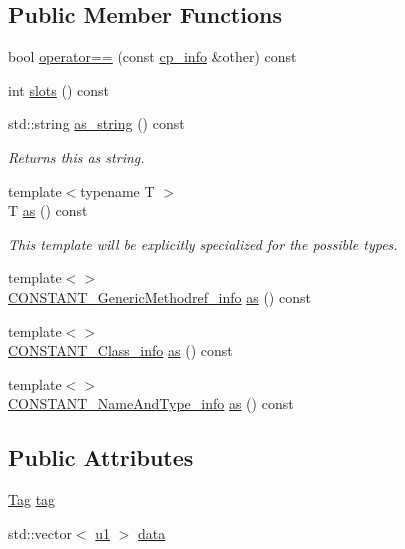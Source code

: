 \subsection*{Public Member Functions}
\begin{DoxyCompactItemize}
\item 
bool \hyperlink{structcp__info_a486b4be323e8194d6efcf388f3533fb1}{operator==} (const \hyperlink{structcp__info}{cp\+\_\+info} \&other) const
\item 
int \hyperlink{structcp__info_a1371b901a960486462d8cc6efc0c6ee8}{slots} () const
\item 
std\+::string \hyperlink{structcp__info_a8bdd7454a673dea621f24569c4c6aa01}{as\+\_\+string} () const
\begin{DoxyCompactList}\small\item\em Returns {\itshape this} as string. \end{DoxyCompactList}\item 
{\footnotesize template$<$typename T $>$ }\\T \hyperlink{structcp__info_a73e88cec575d05a03d73cbfcc91cd71b}{as} () const
\begin{DoxyCompactList}\small\item\em This template will be explicitly specialized for the possible types. \end{DoxyCompactList}\item 
{\footnotesize template$<$$>$ }\\\hyperlink{structCONSTANT__GenericMethodref__info}{C\+O\+N\+S\+T\+A\+N\+T\+\_\+\+Generic\+Methodref\+\_\+info} \hyperlink{structcp__info_a032c6014839b743ea813f1e69df0e478}{as} () const
\item 
{\footnotesize template$<$$>$ }\\\hyperlink{structCONSTANT__Class__info}{C\+O\+N\+S\+T\+A\+N\+T\+\_\+\+Class\+\_\+info} \hyperlink{structcp__info_aa1c10a3fe7a296f25f0f25eb30d96979}{as} () const
\item 
{\footnotesize template$<$$>$ }\\\hyperlink{structCONSTANT__NameAndType__info}{C\+O\+N\+S\+T\+A\+N\+T\+\_\+\+Name\+And\+Type\+\_\+info} \hyperlink{structcp__info_af14ec722b429cf5cb5b7fc52a7a955b8}{as} () const
\end{DoxyCompactItemize}
\subsection*{Public Attributes}
\begin{DoxyCompactItemize}
\item 
\hyperlink{structcp__info_acdef8472ed83e12e3a87bca8d6001f69}{Tag} \hyperlink{structcp__info_a9d61bf7aad6935bfe368e4ec509af6ec}{tag}
\item 
std\+::vector$<$ \hyperlink{types_8h_a162f47a77ee24f6f77cd8c82ccd40ab7}{u1} $>$ \hyperlink{structcp__info_aca6cdfc0ccd687b71c824415258bc870}{data}
\end{DoxyCompactItemize}


